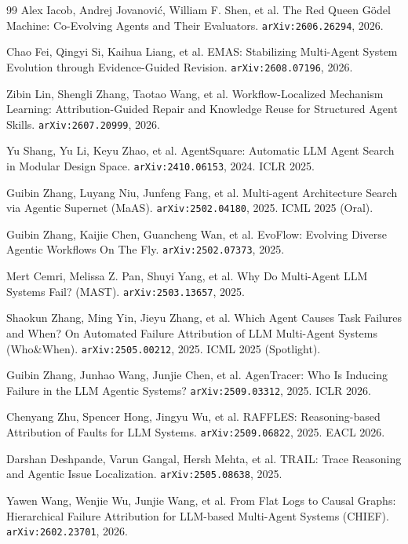 \begin{thebibliography}{99}
 Alex Iacob, Andrej Jovanovi\'{c}, William F. Shen, et
  al. The Red Queen G\"odel Machine: Co-Evolving Agents and Their
  Evaluators. \texttt{arXiv:2606.26294}, 2026.

 Chao Fei, Qingyi Si, Kaihua Liang, et al. EMAS:
  Stabilizing Multi-Agent System Evolution through Evidence-Guided
  Revision. \texttt{arXiv:2608.07196}, 2026.

 Zibin Lin, Shengli Zhang, Taotao Wang, et al.
  Workflow-Localized Mechanism Learning: Attribution-Guided Repair and
  Knowledge Reuse for Structured Agent Skills. \texttt{arXiv:2607.20999},
  2026.

 Yu Shang, Yu Li, Keyu Zhao, et al. AgentSquare:
  Automatic LLM Agent Search in Modular Design Space.
  \texttt{arXiv:2410.06153}, 2024. ICLR 2025.

 Guibin Zhang, Luyang Niu, Junfeng Fang, et al. Multi-agent
  Architecture Search via Agentic Supernet (MaAS). \texttt{arXiv:2502.04180},
  2025. ICML 2025 (Oral).

 Guibin Zhang, Kaijie Chen, Guancheng Wan, et al.
  EvoFlow: Evolving Diverse Agentic Workflows On The Fly.
  \texttt{arXiv:2502.07373}, 2025.

 Mert Cemri, Melissa Z. Pan, Shuyi Yang, et al. Why Do
  Multi-Agent LLM Systems Fail? (MAST). \texttt{arXiv:2503.13657}, 2025.

 Shaokun Zhang, Ming Yin, Jieyu Zhang, et al. Which
  Agent Causes Task Failures and When? On Automated Failure Attribution
  of LLM Multi-Agent Systems (Who\&When). \texttt{arXiv:2505.00212}, 2025.
  ICML 2025 (Spotlight).

 Guibin Zhang, Junhao Wang, Junjie Chen, et al.
  AgenTracer: Who Is Inducing Failure in the LLM Agentic Systems?
  \texttt{arXiv:2509.03312}, 2025. ICLR 2026.

 Chenyang Zhu, Spencer Hong, Jingyu Wu, et al. RAFFLES:
  Reasoning-based Attribution of Faults for LLM Systems.
  \texttt{arXiv:2509.06822}, 2025. EACL 2026.

 Darshan Deshpande, Varun Gangal, Hersh Mehta, et al.
  TRAIL: Trace Reasoning and Agentic Issue Localization.
  \texttt{arXiv:2505.08638}, 2025.

 Yawen Wang, Wenjie Wu, Junjie Wang, et al. From Flat Logs
  to Causal Graphs: Hierarchical Failure Attribution for LLM-based
  Multi-Agent Systems (CHIEF). \texttt{arXiv:2602.23701}, 2026.


\end{thebibliography}
